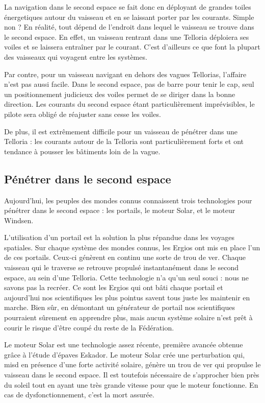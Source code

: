 \begin{multicols}{2}
La navigation dans le second espace se fait donc en déployant de grandes toiles énergetiques autour du vaisseau et en se laissant porter par les courants. Simple non ? En réalité, tout dépend de l'endroit dans lequel le vaisseau se trouve dans le second espace. En effet, un vaisseau rentrant dans une Telloria déploiera ses voiles et se laissera entraîner par le courant. C'est d'ailleurs ce que font la plupart des vaisseaux qui voyagent entre les systèmes.

Par contre, pour un vaisseau navigant en dehors des vagues Tellorias, l'affaire n'est pas aussi facile. Dans le second espace, pas de barre pour tenir le cap, seul un positionnement judicieux des voiles permet de se diriger dans la bonne direction. Les courants du second espace étant particulièrement imprévisibles, le pilote sera obligé de réajuster sans cesse les voiles.

De plus, il est extrêmement difficile pour un vaisseau de pénétrer dans une Telloria : les courants autour de la Telloria sont particulièrement forts et ont tendance à pousser les bâtiments loin de la vague.

\subsection{Pénétrer dans le second espace}

Aujourd'hui, les peuples des mondes connus connaissent trois technologies pour pénétrer dans le second espace : les portails, le moteur Solar, et le moteur Windsen.

L'utilisation d'un portail est la solution la plus répandue dans les voyages spatiales. Sur chaque système des mondes connus, les Ergios ont mis en place l'un de ces portails. Ceux-ci génèrent en continu une sorte de trou de ver. Chaque vaisseau qui le traverse se retrouve propulsé instantanément dans le second espace, au sein d'une Telloria. Cette technologie n'a qu'un seul souci : nous ne savons pas la recréer. Ce sont les Ergios qui ont bâti chaque portail et aujourd'hui nos scientifiques les plus pointus savent tous juste les maintenir en marche. Bien sûr, en démontant un générateur de portail nos scientifiques pourraient sûrement en apprendre plus, mais aucun système solaire n'est prêt à courir le risque d'être coupé du reste de la Fédération.

Le moteur Solar est une technologie assez récente, première avancée obtenue grâce à l'étude d'épaves Eskador. Le moteur Solar crée une perturbation qui, misd en présence d'une forte activité solaire, génère un trou de ver qui propulse le vaisseau dans le second espace. Il est toutefois nécessaire de s'approcher bien près du soleil tout en ayant une très grande vitesse pour que le moteur fonctionne. En cas de dysfonctionnement, c'est la mort assurée.


\end{multicols}
